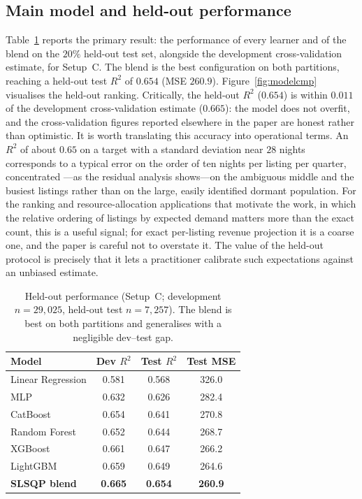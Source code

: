 \documentclass[journal]{IEEEtran}
\begin{document}
\subsection{Main model and held-out performance}
Table~\ref{tab:heldout} reports the primary result: the performance of every
learner and of the blend on the $20\%$ held-out test set, alongside the
development cross-validation estimate, for Setup~C. The blend is the best
configuration on both partitions, reaching a held-out test $R^2$ of $0.654$
(MSE $260.9$). Figure~\ref{fig:modelcmp} visualises the held-out ranking.
Critically, the held-out $R^2$ ($0.654$) is within $0.011$ of the development
cross-validation estimate ($0.665$): the model does not overfit, and the
cross-validation figures reported elsewhere in the paper are honest rather than
optimistic. It is worth translating this accuracy into operational terms. An $R^2$
of about $0.65$ on a target with a standard deviation near $28$ nights corresponds
to a typical error on the order of ten nights per listing per quarter, concentrated
---as the residual analysis shows---on the ambiguous middle and the busiest
listings rather than on the large, easily identified dormant population. For the
ranking and resource-allocation applications that motivate the work, in which the
relative ordering of listings by expected demand matters more than the exact count,
this is a useful signal; for exact per-listing revenue projection it is a coarse
one, and the paper is careful not to overstate it. The value of the held-out
protocol is precisely that it lets a practitioner calibrate such expectations
against an unbiased estimate.

\begin{table}[!t]
\caption{Held-out performance (Setup~C; development $n=29{,}025$, held-out test
$n=7{,}257$). The blend is best on both partitions and generalises with a
negligible dev--test gap.}
\label{tab:heldout}
\centering
\begin{tabular}{lccc}
\toprule
Model & Dev $R^2$ & Test $R^2$ & Test MSE \\
\midrule
Linear Regression & 0.581 & 0.568 & 326.0 \\
MLP & 0.632 & 0.626 & 282.4 \\
CatBoost & 0.654 & 0.641 & 270.8 \\
Random Forest & 0.652 & 0.644 & 268.7 \\
XGBoost & 0.661 & 0.647 & 266.2 \\
LightGBM & 0.659 & 0.649 & 264.6 \\
\textbf{SLSQP blend} & \textbf{0.665} & \textbf{0.654} & \textbf{260.9} \\
\bottomrule
\end{tabular}
\end{table}
\end{document}
